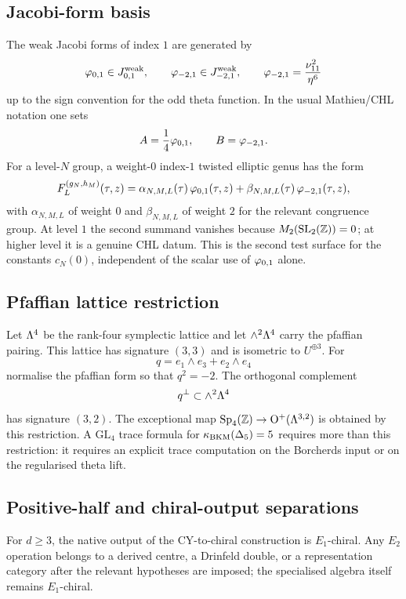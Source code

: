 \subsection*{Jacobi-form basis}

The weak Jacobi forms of index $1$ are generated by
\[
  \varphi_{0,1} \in J^{\mathrm{weak}}_{0,1},
  \qquad
  \varphi_{-2,1} \in J^{\mathrm{weak}}_{-2,1},
  \qquad
  \varphi_{-2,1}=\frac{\nu_{11}^2}{\eta^6}
\]
up to the sign convention for the odd theta function.  In the usual
Mathieu/CHL notation one sets
\[
  A=\frac14\varphi_{0,1},\qquad B=\varphi_{-2,1} .
\]
For a level-$N$ group, a weight-$0$ index-$1$ twisted elliptic genus has
the form
\[
  F_L^{(g_N,h_M)}(\tau,z)
  =\alpha_{N,M,L}(\tau)\,\varphi_{0,1}(\tau,z)
  +\beta_{N,M,L}(\tau)\,\varphi_{-2,1}(\tau,z),
\]
with $\alpha_{N,M,L}$ of weight $0$ and $\beta_{N,M,L}$ of weight $2$
for the relevant congruence group.  At level $1$ the second summand
vanishes because $M_2(\mathrm{SL}_2(\mathbb{Z}))=0$; at higher level it is a
genuine CHL datum.  This is the second test surface for the constants
$c_N(0)$, independent of the scalar use of $\varphi_{0,1}$ alone.

\subsection*{Pfaffian lattice restriction}

Let $\Lambda^4$ be the rank-four symplectic lattice and let
$\wedge^2\Lambda^4$ carry the pfaffian pairing.  This lattice has signature
$(3,3)$ and is isometric to $U^{\oplus 3}$.  For
\[
  q=e_1\wedge e_3+e_2\wedge e_4
\]
normalise the pfaffian form so that $q^2=-2$.  The orthogonal complement
\[
  q^\perp\subset \wedge^2\Lambda^4
\]
has signature $(3,2)$.  The exceptional map
$\mathrm{Sp}_4(\mathbb{Z})\to \mathrm{O}^+(\Lambda^{3,2})$ is obtained by this
restriction.  A $\mathrm{GL}_4$ trace formula for
$\kappa_{\mathrm{BKM}}(\Delta_{5})=5$ requires more than this restriction: it requires
an explicit trace computation on the Borcherds input or on the
regularised theta lift.

\subsection*{Positive-half and chiral-output separations}

For $d\geq 3$, the native output of the CY-to-chiral construction is
$E_1$-chiral.  Any $E_2$ operation belongs to a derived centre, a
Drinfeld double, or a representation category after the relevant
hypotheses are imposed; the specialised algebra itself remains
$E_1$-chiral.

